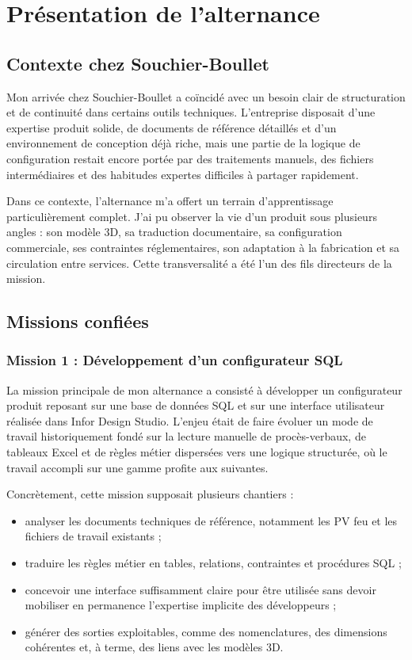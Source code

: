 \chapter{Présentation de l'alternance}

\section{Contexte chez Souchier-Boullet}

Mon arrivée chez Souchier-Boullet a coïncidé avec un besoin clair de structuration et de continuité dans certains outils techniques. L'entreprise disposait d'une expertise produit solide, de documents de référence détaillés et d'un environnement de conception déjà riche, mais une partie de la logique de configuration restait encore portée par des traitements manuels, des fichiers intermédiaires et des habitudes expertes difficiles à partager rapidement.

Dans ce contexte, l'alternance m'a offert un terrain d'apprentissage particulièrement complet. J'ai pu observer la vie d'un produit sous plusieurs angles : son modèle 3D, sa traduction documentaire, sa configuration commerciale, ses contraintes réglementaires, son adaptation à la fabrication et sa circulation entre services. Cette transversalité a été l'un des fils directeurs de la mission.

\section{Missions confiées}

\subsection{Mission 1 : Développement d'un configurateur SQL}

La mission principale de mon alternance a consisté à développer un configurateur produit reposant sur une base de données SQL et sur une interface utilisateur réalisée dans Infor Design Studio. L'enjeu était de faire évoluer un mode de travail historiquement fondé sur la lecture manuelle de procès-verbaux, de tableaux Excel et de règles métier dispersées vers une logique structurée, où le travail accompli sur une gamme profite aux suivantes.

Concrètement, cette mission supposait plusieurs chantiers :

\begin{itemize}[leftmargin=1.4cm]
\item analyser les documents techniques de référence, notamment les PV feu et les fichiers de travail existants ;
\item traduire les règles métier en tables, relations, contraintes et procédures SQL ;
\item concevoir une interface suffisamment claire pour être utilisée sans devoir mobiliser en permanence l'expertise implicite des développeurs ;
\item générer des sorties exploitables, comme des nomenclatures, des dimensions cohérentes et, à terme, des liens avec les modèles 3D.
\end{itemize}

